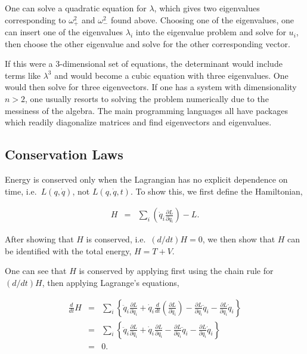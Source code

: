 \documentclass[%
oneside,                 %
final,                   %
10pt]{article}
\begin{document}
One can solve a quadratic equation for $\lambda$, which gives two
eigenvalues corresponding to $\omega_+^2$ and $\omega_-^2$ found
above. Choosing one of the eigenvalues, one can insert one of the
eigenvalues $\lambda_i$ into the eigenvalue problem  and solve for $u_i$,
then choose the other eigenvalue and solve for the other corresponding
vector.

If this were a 3-dimensional set of equations, the determinant would
include terms like $\lambda^3$ and would become a cubic equation with
three eigenvalues. One would then solve for three eigenvectors. If one
has a system with dimensionality $n>2$, one usually resorts to solving
the problem numerically due to the messiness of the algebra. The main
programming languages all have packages which readily diagonalize
matrices and find eigenvectors and eigenvalues.

\subsection{Conservation Laws}

Energy is conserved only when the Lagrangian has no explicit
dependence on time, i.e.~$L(q,\dot{q})$, not $L(q,\dot{q},t)$. To show
this, we first define the Hamiltonian,

\begin{eqnarray}
H&=&\sum_i\left(\dot{q}_i\frac{\partial L}{\partial\dot{q}_i}\right)-L.
\end{eqnarray}

After showing that $H$ is conserved, i.e.~$(d/dt)H=0$, we then show
that $H$ can be identified with the total energy, $H=T+V$.

One can see that $H$ is conserved by applying first using the chain
rule for $(d/dt)H$, then applying Lagrange's
equations,

\begin{eqnarray}
\frac{d}{dt}H&=&\sum_i\left\{\ddot{q}_i\frac{\partial L}{\partial\dot{q}_i}+\dot{q}_i\frac{d}{dt}\left(\frac{\partial L}{\partial\dot{q}_i}\right)-\frac{\partial L}{\partial\dot{q}_i}\ddot{q}_i-\frac{\partial L}{\partial q_i}\dot{q}_i\right\}\\
\nonumber
&=&\sum_i\left\{\ddot{q}_i\frac{\partial L}{\partial\dot{q}_i}+\dot{q}_i\frac{\partial L}{\partial q_i}-\frac{\partial L}{\partial\dot{q}_i}\ddot{q}_i-\frac{\partial L}{\partial q_i}\dot{q}_i\right\}\\
\nonumber
&=&0.
\end{eqnarray}
\end{document}
